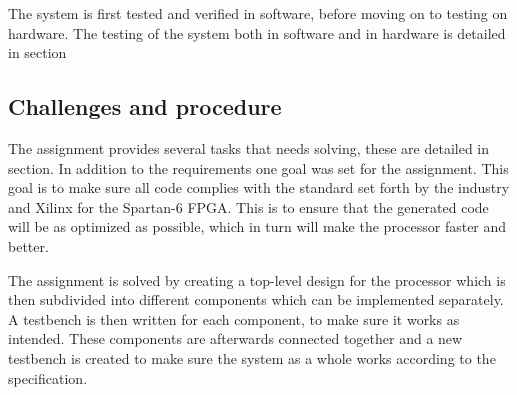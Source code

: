 The system is first tested and verified in software, before moving on to testing on hardware.
The testing of the system both in software and in hardware is detailed in section%

\subsection{Challenges and procedure}

The assignment provides several tasks that needs solving, these are detailed in section.%
In addition to the requirements one goal was set for the assignment.
This goal is to make sure all code complies with the standard set forth by the industry
and Xilinx for the Spartan-6 FPGA.
This is to ensure that the generated code will be as optimized as possible,
which in turn will make the processor faster and better.

The assignment is solved by creating a top-level design for the processor which is then subdivided into different components which can be implemented separately.
A testbench is then written for each component, to make sure it works as intended.
These components are afterwards connected together and a new testbench is created to
make sure the system as a whole works according to the specification.
